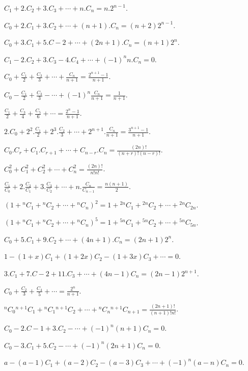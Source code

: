 \item $C_1 + 2.C_2 + 3.C_3 + \cdots + n.C_n = n.2^{n - 1}$.
\item $C_0 + 2.C_1 + 3.C_2 + \cdots + (n + 1).C_n = (n + 2)2^{n - 1}$.
\item $C_0 + 3.C_1 + 5.C-2 + \cdots + (2n + 1).C_n = (n + 1)2^n$.
\item $C_1 - 2.C_2 + 3.C_3 - 4.C_4 + \cdots + (-1)^nn.C_n = 0$.
\item $C_0 + \frac{C_1}{2} + \frac{C_3}{3} + \cdots + \frac{C_n}{n + 1} = \frac{2^{n+ 1} - 1}{n + 1}$.
\item $C_0 - \frac{C_1}{2} + \frac{C_3}{3} - \cdots + (-1)^n\frac{C_n}{n + 1} = \frac{1}{n + 1}$.
\item $\frac{C_1}{2}+ \frac{C_3}{4} + \frac{C_5}{6} + \cdots = \frac{2^n - 1}{n + 1}$.
\item $2.C_0 + 2^2.\frac{C_1}{2} + 2^3.\frac{C_2}{3} + \cdots + 2^{n + 1}.\frac{C_n}{n + 1} = \frac{3^{n + 1} - 1}{n + 1}$.
\item $C_0.C_r + C_1.C_{r + 1} + \cdots + C_{n-r}.C_n = \frac{(2n)!}{(n + r)!(n - r)!}$.
\item $C_0^2 + C_1^2 + C_2^2 + \cdots + C_n^2 = \frac{(2n)!}{n!n!}$.
\item $\frac{C_1}{C_0} + 2.\frac{C_2}{C_1} + 3.\frac{C_3}{C_2} + \cdots + n.\frac{C_n}{C_{n - 1}} = \frac{n(n + 1)}{2}$.
\item $(1 + {}^nC_1 + {}^nC_2 + \cdots + {}^nC_n)^2 = 1 + {}^{2n}C_1 + {}^{2n}C_2 + \cdots + {}^{2n}C_{2n}$.
\item $(1 + {}^nC_1 + {}^nC_2 + \cdots + {}^nC_n)^5 = 1 + {}^{5n}C_1 + {}^{5n}C_2 + \cdots + {}^{5n}C_{5n}$.
\item $C_0 + 5.C_1 + 9.C_2 + \cdots + (4n + 1).C_n = (2n + 1)2^n$.
\item $1 - (1 + x)C_1 + (1 + 2x)C_2 - (1 + 3x)C_3 + \cdots = 0$.
\item $3.C_1 + 7.C-2 + 11.C_3 + \cdots + (4n - 1)C_n = (2n - 1)2^{n + 1}$.
\item $C_0 + \frac{C_2}{3} + \frac{C_4}{5} + \cdots = \frac{2^n}{n + 1}$.
\item ${}^nC_0{}^{n + 1}C_1 + {}^nC_1{}^{n + 1}C_2 + \cdots + {}^nC_n{}^{n + 1}C_{n + 1} = \frac{(2n + 1)!}{(n + 1)!n!}$.
\item $C_0 - 2.C-1 + 3.C_2 - \cdots + (-1)^n(n + 1)C_n = 0$.
\item $C_0 -3.C_1 + 5.C_2 - \cdots + (-1)^n(2n + 1)C_n = 0$.
\item $a - (a - 1)C_1 + (a - 2)C_2 - (a - 3)C_3 + \cdots + (-1)^n(a - n)C_n = 0$.
